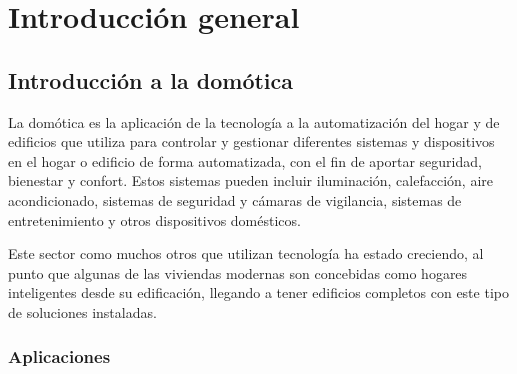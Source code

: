 
\chapter{Introducción general} %

\label{Chapter1} %
\label{IntroGeneral}


\newcommand{\keyword}[1]{\textbf{#1}}
\newcommand{\tabhead}[1]{\textbf{#1}}
\newcommand{\code}[1]{\texttt{#1}}
\newcommand{\file}[1]{\texttt{\bfseries#1}}
\newcommand{\option}[1]{\texttt{\itshape#1}}
\newcommand{\grados}{$^{\circ}$}



\section{Introducción a la domótica}

La domótica es la aplicación de la tecnología a la automatización del hogar y de edificios que utiliza para controlar y gestionar diferentes sistemas y dispositivos en el hogar o edificio de forma automatizada, con el fin de aportar seguridad, bienestar y confort. Estos sistemas pueden incluir iluminación, calefacción, aire acondicionado, sistemas de seguridad y cámaras de vigilancia, sistemas de entretenimiento y otros dispositivos domésticos. \citep{1}

Este sector como muchos otros que utilizan tecnología ha estado creciendo, al punto que algunas de las viviendas modernas son concebidas como hogares inteligentes desde su edificación, llegando a tener edificios completos con este tipo de soluciones instaladas.

\subsection{Aplicaciones}

